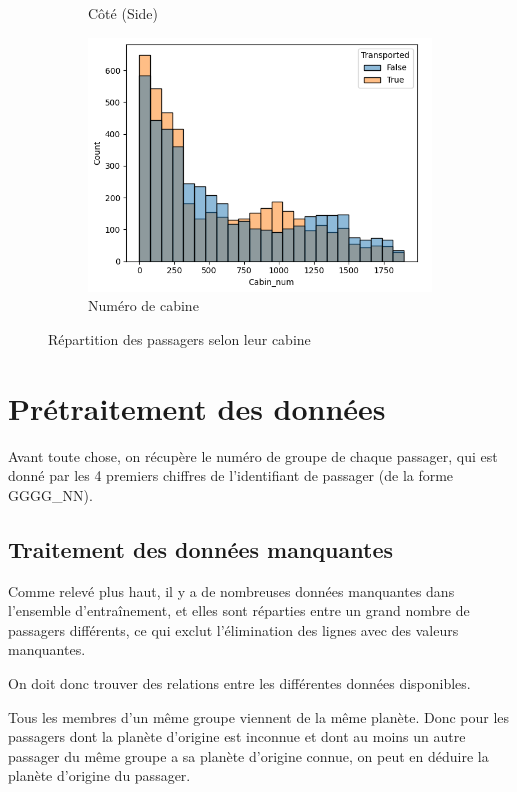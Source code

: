 \documentclass[a4paper]{article}
\begin{document}
\begin{figure}
\begin{subfigure}{.5\textwidth}
            \caption{Côté (Side)}
        \end{subfigure}
        \begin{subfigure}{.5\textwidth}
            \centering
            \includegraphics[width=\linewidth]{images/Figure 9.png}
            \caption{Numéro de cabine}
        \end{subfigure}
        \caption{Répartition des passagers selon leur cabine}
    \end{figure}

    \section{Prétraitement des données}

    Avant toute chose, on récupère le numéro de groupe de chaque passager, qui est donné par les 4 premiers chiffres
    de l'identifiant de passager (de la forme GGGG\_NN).

    \subsection{Traitement des données manquantes}

    Comme relevé plus haut, il y a de nombreuses données manquantes dans l'ensemble d'entraînement,
    et elles sont réparties entre un grand nombre de passagers différents, ce qui exclut l'élimination
    des lignes avec des valeurs manquantes.

    On doit donc trouver des relations entre les différentes données disponibles.

    Tous les membres d'un même groupe viennent de la même planète. Donc pour les passagers dont la planète d'origine
    est inconnue et dont au moins un autre passager du même groupe a sa planète d'origine connue,
    on peut en déduire la planète d'origine du passager.
\end{document}
